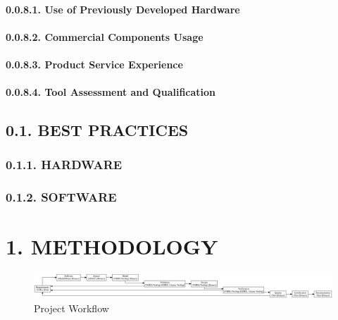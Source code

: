 \documentclass[
]{article}
\begin{document}
\hypertarget{use-of-previously-developed-hardware}{%
\paragraph{0.0.8.1. Use of Previously Developed
Hardware}\label{use-of-previously-developed-hardware}}

\hypertarget{commercial-components-usage}{%
\paragraph{0.0.8.2. Commercial Components
Usage}\label{commercial-components-usage}}

\hypertarget{product-service-experience}{%
\paragraph{0.0.8.3. Product Service
Experience}\label{product-service-experience}}

\hypertarget{tool-assessment-and-qualification}{%
\paragraph{0.0.8.4. Tool Assessment and
Qualification}\label{tool-assessment-and-qualification}}

\hypertarget{best-practices}{%
\subsection{0.1. BEST PRACTICES}\label{best-practices}}

\hypertarget{hardware}{%
\subsubsection{0.1.1. HARDWARE}\label{hardware}}

\hypertarget{software}{%
\subsubsection{0.1.2. SOFTWARE}\label{software}}

\hypertarget{methodology}{%
\section{1. METHODOLOGY}\label{methodology}}

\begin{figure}
\centering
\includegraphics{../doc/project.svg}
\caption{Project Workflow}
\end{figure}
\end{document}
